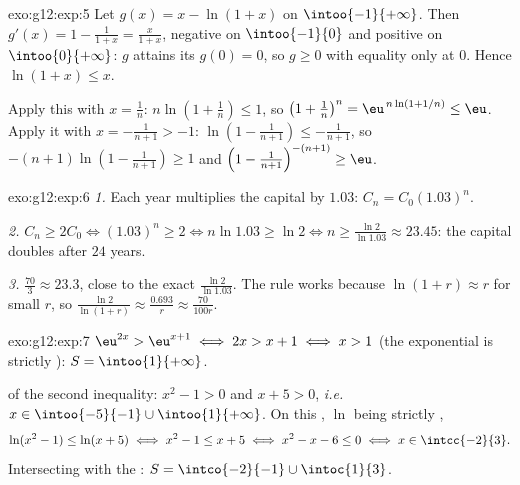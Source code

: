 \begin{solution}{exo:g12:exp:5}
Let $g(x) = x - \ln(1+x)$ on $\intoo{-1}{+\infty}$. Then
$g'(x) = 1 - \frac{1}{1+x} = \frac{x}{1+x}$, negative on $\intoo{-1}{0}$ and
positive on $\intoo{0}{+\infty}$: $g$ attains its  $g(0) = 0$, so
$g \geq 0$ with equality only at $0$. Hence $\ln(1+x) \leq x$.

Apply this with $x = \frac1n$:
$n\ln\left(1 + \frac1n\right) \leq 1$, so
$\left(1+\frac1n\right)^n = \eu^{\,n\ln(1+1/n)} \leq \eu$.
Apply it with $x = -\frac{1}{n+1} > -1$:
$\ln\left(1 - \frac{1}{n+1}\right) \leq -\frac{1}{n+1}$, so
$-(n+1)\ln\left(1 - \frac{1}{n+1}\right) \geq 1$ and
$\left(1 - \frac{1}{n+1}\right)^{-(n+1)} \geq \eu$.
\end{solution}

\begin{solution}{exo:g12:exp:6}
\emph{1.} Each year multiplies the capital by $1.03$: $C_n = C_0 (1.03)^n$.

\emph{2.} $C_n \geq 2C_0 \iff (1.03)^n \geq 2 \iff n \ln 1.03 \geq \ln 2
\iff n \geq \frac{\ln 2}{\ln 1.03} \approx 23.45$: the capital doubles after
$24$ years.

\emph{3.} $\frac{70}{3} \approx 23.3$, close to the exact
$\frac{\ln 2}{\ln 1.03}$. The rule works because
$\ln(1 + r) \approx r$ for small $r$, so
$\frac{\ln 2}{\ln(1+r)} \approx \frac{0.693}{r} \approx \frac{70}{100r}$.
\end{solution}

\begin{solution}{exo:g12:exp:7}
$\eu^{2x} > \eu^{x+1} \iff 2x > x + 1 \iff x > 1$ (the exponential is
strictly ): $S = \intoo{1}{+\infty}$.

 of the second inequality: $x^2 - 1 > 0$ and $x + 5 > 0$, \emph{i.e.}
$x \in \intoo{-5}{-1} \cup \intoo{1}{+\infty}$. On this , $\ln$ being
strictly ,
\[
\ln(x^2-1) \leq \ln(x+5) \iff x^2 - 1 \leq x + 5 \iff x^2 - x - 6 \leq 0
\iff x \in \intcc{-2}{3}.
\]
Intersecting with the : $S = \intco{-2}{-1} \cup \intoc{1}{3}$.
\end{solution}

